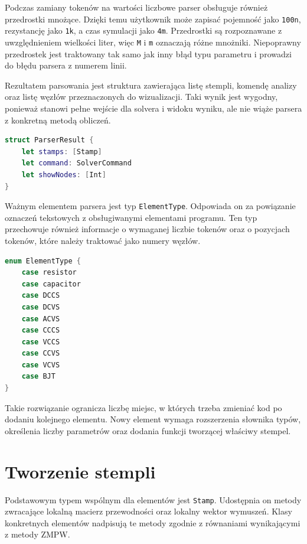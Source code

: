 Podczas zamiany tokenów na wartości liczbowe parser obsługuje również przedrostki mnożące. Dzięki temu użytkownik może zapisać pojemność jako \texttt{100n}, rezystancję jako \texttt{1k}, a czas symulacji jako \texttt{4m}. Przedrostki są rozpoznawane z uwzględnieniem wielkości liter, więc \texttt{M} i \texttt{m} oznaczają różne mnożniki. Niepoprawny przedrostek jest traktowany tak samo jak inny błąd typu parametru i prowadzi do błędu parsera z numerem linii.

Rezultatem parsowania jest struktura zawierająca listę stempli, komendę analizy oraz listę węzłów przeznaczonych do wizualizacji. Taki wynik jest wygodny, ponieważ stanowi pełne wejście dla solvera i widoku wyniku, ale nie wiąże parsera z konkretną metodą obliczeń.

\begin{lstlisting}[language=Swift,caption={Model wyniku parsowania},label={lst:parser-result}]
struct ParserResult {
    let stamps: [Stamp]
    let command: SolverCommand
    let showNodes: [Int]
}
\end{lstlisting}

Ważnym elementem parsera jest typ \texttt{ElementType}. Odpowiada on za powiązanie oznaczeń tekstowych z obsługiwanymi elementami programu. Ten typ przechowuje również informacje o wymaganej liczbie tokenów oraz o pozycjach tokenów, które należy traktować jako numery węzłów.

\begin{lstlisting}[language=Swift,caption={Uproszczona rola typu ElementType},label={lst:element-type}]
enum ElementType {
    case resistor
    case capacitor
    case DCCS
    case DCVS
    case ACVS
    case CCCS
    case VCCS
    case CCVS
    case VCVS
    case BJT
}
\end{lstlisting}

Takie rozwiązanie ogranicza liczbę miejsc, w których trzeba zmieniać kod po dodaniu kolejnego elementu. Nowy element wymaga rozszerzenia słownika typów, określenia liczby parametrów oraz dodania funkcji tworzącej właściwy stempel.

\section{Tworzenie stempli}
\label{sec:implementacja-stemple}

Podstawowym typem wspólnym dla elementów jest \texttt{Stamp}. Udostępnia on metody zwracające lokalną macierz przewodności oraz lokalny wektor wymuszeń. Klasy konkretnych elementów nadpisują te metody zgodnie z równaniami wynikającymi z metody ZMPW.

